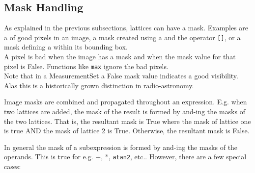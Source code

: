 \subsection{\label{LEL:HANDMASKS}Mask Handling}

As explained in the previous subsections, lattices can have a mask. 
Examples are a  of good pixels in an image,
a mask created using a 
and the operator \texttt{[]},
or a mask defining a  within its bounding
box.
\\A pixel is bad when the image has a mask and when the
mask value for that pixel is False. Functions like
\texttt{max} ignore the bad pixels.
\\Note that in a MeasurementSet a False mask value indicates a good
visibility. Alas this is a historically grown distinction in
radio-astronomy.

\medskip\noindent Image masks are combined and propagated throughout an
expression.  E.g.  when
two lattices are added, the mask of the result is formed by and-ing the
masks of the two lattices.   That is, the resultant mask is True where the
mask of lattice one is true AND the mask of lattice 2 is True. Otherwise,
the resultant mask is False.

\medskip\noindent In general the mask of a subexpression is formed by and-ing the masks
of the operands.  This is true for e.g.  +, *, \texttt{atan2}, etc.. 
However, there are a few special cases:


